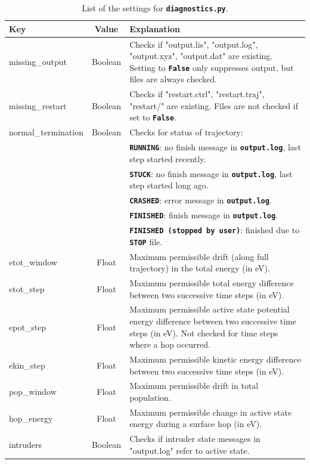 \documentclass[a4paper,10pt,DIV=15,openany]{scrbook}
\newcommand{\ttt}[1]{\textbf{\texttt{#1}}}
\begin{document}
\begin{table}
  \centering
  \caption{List of the settings for \ttt{diagnostics.py}.}
  \label{tab:diagnostics}
  \begin{tabular}{>{\ttfamily}lcp{11cm}}
    \hline
    Key  &Value     &Explanation\\
    \hline
    missing\_output     &Boolean        &Checks if "output.lis", "output.log", "output.xyz", "output.dat" are existing. Setting to \ttt{False} only suppresses output, but files are always checked.\\
    missing\_restart    &Boolean        &Checks if "restart.ctrl", "restart.traj", "restart/" are existing. Files are not checked if set to \ttt{False}.\\
    normal\_termination &Boolean        &Checks for status of trajectory:\\
                                       &&\ttt{RUNNING}: no finish message in \ttt{output.log}, last step started recently.\\
                                       &&\ttt{STUCK}: no finish message in \ttt{output.log}, last step started long ago.\\
                                       &&\ttt{CRASHED}: error message in \ttt{output.log}.\\
                                       &&\ttt{FINISHED}: finish message in \ttt{output.log}.\\
                                       &&\ttt{FINISHED (stopped by user)}: finished due to \ttt{STOP} file.\\
    etot\_window        &Float          &Maximum permissible drift (along full trajectory) in the total energy (in eV).\\
    etot\_step          &Float          &Maximum permissible total energy difference between two successive time steps (in eV).\\
    epot\_step          &Float          &Maximum permissible active state potential energy difference between two successive time steps (in eV). Not checked for time steps where a hop occurred.\\
    ekin\_step          &Float          &Maximum permissible kinetic energy difference between two successive time steps (in eV).\\
    pop\_window         &Float          &Maximum permissible drift in total population.\\
    hop\_energy         &Float          &Maximum permissible change in active state energy during a surface hop (in eV).\\
    intruders           &Boolean        &Checks if intruder state messages in "output.log" refer to active state.\\
    \hline
  \end{tabular}
\end{table}
\end{document}

